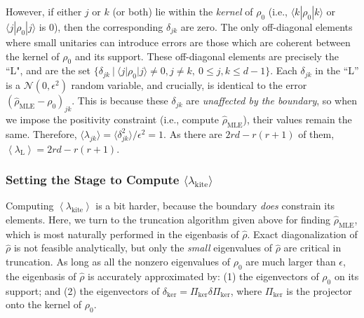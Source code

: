 \documentclass[aps,pra, twocolumn]{revtex4-1}
\newcommand{\expect}[1]{\ensuremath{\left\langle#1\right\rangle}}
\newcommand{\rhohat}{\hat{\rho}}
\newcommand{\rhoMLE}{\rhohat_{\scriptscriptstyle\mathrm{MLE}}}
\begin{document}
However, if either $j$ or $k$ (or both) lie within the \emph{kernel} of $\rho_{0}$ (i.e., $\langle k | \rho_{0}| k \rangle$ or $\langle j|\rho_{0}|j\rangle$ is 0), then the corresponding $\delta_{jk}$ are zero. The only off-diagonal elements where small unitaries can introduce errors are those which are coherent between the kernel of $\rho_{0}$ and its support. These off-diagonal elements are precisely the ``L", and are  the set $\{\delta_{jk}~|~\langle j | \rho_{0}|j\rangle \neq 0, j\neq k, ~ 0 \leq j,k \leq d - 1\}$. Each $\delta_{jk}$ in the ``L'' is a $\mathcal{N}(0, \epsilon^{2})$ random variable, and crucially, is identical to the error $(\rhoMLE - \rho_{0})_{jk}$. This is because these $\delta_{jk}$ are \emph{unaffected by the boundary}, so when we impose the positivity constraint (i.e., compute $\rhoMLE$), their values remain the same. Therefore, $\langle \lambda_{jk}\rangle = \langle \delta_{jk}^{2}\rangle /\epsilon^{2} = 1$. As there are $2rd - r(r+1)$ of them, $\expect{\lambda_{\mathrm{L}}} = 2rd - r(r+1)$.

\subsubsection{Setting the Stage to Compute $\langle \lambda_\mathrm{kite}\rangle$}
Computing $\expect{\lambda_{\mathrm{kite}}}$ is a bit harder, because the boundary \emph{does} constrain its elements.  Here, we turn to the truncation algorithm given above for finding $\rhoMLE$, which is most naturally performed in the eigenbasis of $\hat\rho$.  Exact diagonalization of $\hat\rho$ is not feasible analytically, but only the \emph{small} eigenvalues of $\hat\rho$ are critical in truncation.  As long as all the nonzero eigenvalues of $\rho_0$ are much larger than $\epsilon$, the eigenbasis of $\hat\rho$ is accurately approximated by: (1) 
the eigenvectors of $\rho_0$ on its support; and (2) the eigenvectors of $\delta_{\mathrm{ker}} = \Pi_{\mathrm{ker}}\delta\Pi_{\mathrm{ker}}$, where $\Pi_{\mathrm{ker}}
$ is the projector onto the kernel of $\rho_0$.
\end{document}
